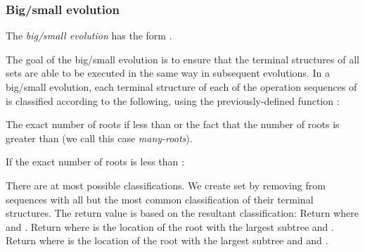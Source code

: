 \subsubsection{Big/small evolution} 
The \emph{big/small evolution} has the form .
\begin{fullonly}

\end{fullonly}
The goal of the big/small evolution is to ensure that the terminal structures of all sets are able to be executed in the same way in subsequent evolutions.
In a big/small evolution, each terminal structure of each of the operation sequences of  is classified according to the following, using the previously-defined function : 
\begin{itemize\shortfull{*}{}}

\item The exact number of roots if less than  or the fact that the number of roots is greater than  (we call this case \emph{many-roots}). 

\item If the exact number of roots is less than :
\begin{fullonly}
\end{fullonly}


\end{itemize\shortfull{*}{}}

There are at most  possible classifications. We create set  by removing from   sequences with all but the most common classification of their terminal structures. 
The return value is based on the resultant classification:
\shortfull{}{\begin{description}}
 Return  where  and .
 Return  where  is the location of the root with the largest subtree and .
 Return  where  is the location of the root with the largest subtree and and .
\shortfull{}{\end{description}}

